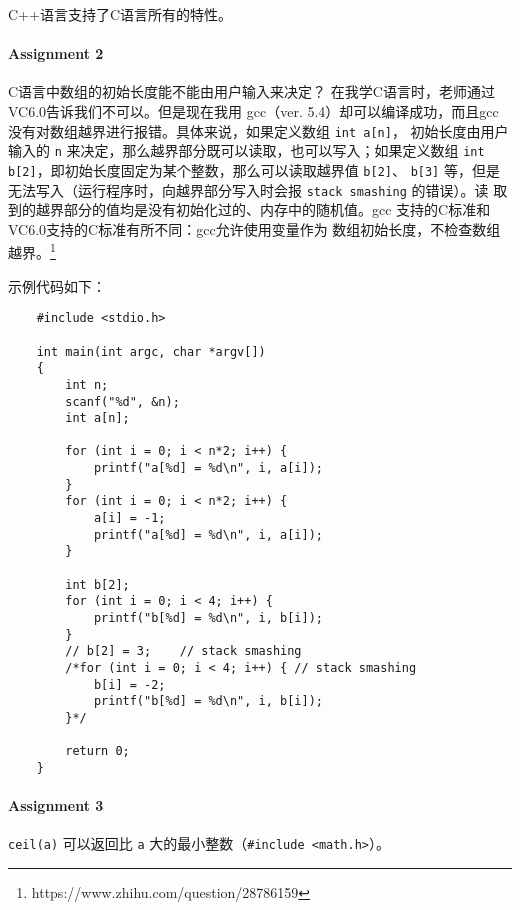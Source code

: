 \documentclass[UTF8]{ctexart}
\begin{document}
C++语言支持了C语言所有的特性。

\paragraph{Assignment 2}
C语言中数组的初始长度能不能由用户输入来决定？ 在我学C语言时，老师通过VC6.0告诉我们不可以。但是现在我用
gcc（ver. 5.4）却可以编译成功，而且gcc没有对数组越界进行报错。具体来说，如果定义数组 \texttt{int a[n]}，
初始长度由用户输入的 \texttt{n} 来决定，那么越界部分既可以读取，也可以写入；如果定义数组
\texttt{int b[2]}，即初始长度固定为某个整数，那么可以读取越界值 \texttt{b[2]}、
\texttt{b[3]} 等，但是无法写入（运行程序时，向越界部分写入时会报 \texttt{stack smashing} 的错误）。读
取到的越界部分的值均是没有初始化过的、内存中的随机值。gcc 支持的C标准和VC6.0支持的C标准有所不同：gcc允许使用变量作为
数组初始长度，不检查数组越界。\footnote{https://www.zhihu.com/question/28786159}

示例代码如下：
\begin{verbatim}
    #include <stdio.h>

    int main(int argc, char *argv[])
    {
        int n;
        scanf("%d", &n);
        int a[n];

        for (int i = 0; i < n*2; i++) {
            printf("a[%d] = %d\n", i, a[i]);
        }
        for (int i = 0; i < n*2; i++) {
            a[i] = -1;
            printf("a[%d] = %d\n", i, a[i]);
        }

        int b[2];
        for (int i = 0; i < 4; i++) {
            printf("b[%d] = %d\n", i, b[i]);
        }
        // b[2] = 3;    // stack smashing
        /*for (int i = 0; i < 4; i++) { // stack smashing
            b[i] = -2;
            printf("b[%d] = %d\n", i, b[i]);
        }*/

        return 0;
    }
\end{verbatim}

\paragraph{Assignment 3}
\texttt{ceil(a)} 可以返回比 \texttt{a} 大的最小整数（\texttt{#include <math.h>}）。
\end{document}
